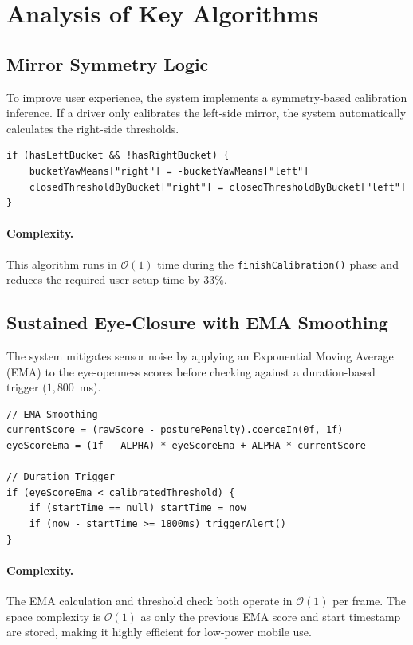 \documentclass[11pt]{report}
\begin{document}
\section{Analysis of Key Algorithms}\label{sec:key-algorithms}

\subsection{Mirror Symmetry Logic}\label{subsec:mirror-algo}
To improve user experience, the system implements a symmetry-based calibration inference. If a driver only calibrates the left-side mirror, the system automatically calculates the right-side thresholds.

\begin{verbatim}
if (hasLeftBucket && !hasRightBucket) {
    bucketYawMeans["right"] = -bucketYawMeans["left"]
    closedThresholdByBucket["right"] = closedThresholdByBucket["left"]
}
\end{verbatim}

\paragraph{Complexity.}
This algorithm runs in $\mathcal{O}(1)$ time during the \texttt{finishCalibration()} phase and reduces the required user setup time by $33\%$.

\subsection{Sustained Eye-Closure with EMA Smoothing}\label{subsec:ema-algo}
The system mitigates sensor noise by applying an Exponential Moving Average (EMA) to the eye-openness scores before checking against a duration-based trigger ($1,800$~ms).

\begin{verbatim}
// EMA Smoothing
currentScore = (rawScore - posturePenalty).coerceIn(0f, 1f)
eyeScoreEma = (1f - ALPHA) * eyeScoreEma + ALPHA * currentScore

// Duration Trigger
if (eyeScoreEma < calibratedThreshold) {
    if (startTime == null) startTime = now
    if (now - startTime >= 1800ms) triggerAlert()
}
\end{verbatim}

\paragraph{Complexity.}
The EMA calculation and threshold check both operate in $\mathcal{O}(1)$ per frame. The space complexity is $\mathcal{O}(1)$ as only the previous EMA score and start timestamp are stored, making it highly efficient for low-power mobile use.
\end{document}
